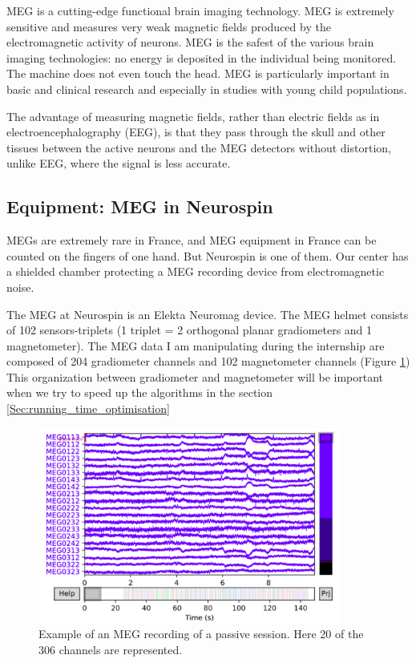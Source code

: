 MEG is a cutting-edge functional brain imaging technology. MEG is extremely sensitive and measures very weak magnetic fields produced by the electromagnetic activity of neurons. MEG is the safest of the various brain imaging technologies: no energy is deposited in the individual being monitored. The machine does not even touch the head. MEG is particularly important in basic and clinical research and especially in studies with young child populations.

The advantage of measuring magnetic fields, rather than electric fields as in electroencephalography (EEG), is that they pass through the skull and other tissues between the active neurons and the MEG detectors without distortion, unlike EEG, where the signal is less accurate.

\subsection{Equipment: MEG in Neurospin}

MEGs are extremely rare in France, and MEG equipment in France can be counted on the fingers of one hand. But Neurospin is one of them. Our center has a shielded chamber protecting a MEG recording device from electromagnetic noise.

The MEG at Neurospin is an Elekta Neuromag device. The MEG helmet consists of 102 sensors-triplets (1 triplet = 2 orthogonal planar gradiometers and 1 magnetometer). The MEG data I am manipulating during the internship are composed of 204 gradiometer channels and 102 magnetometer channels (Figure \ref{raw_data}) This organization between gradiometer and magnetometer will be important when we try to speed up the algorithms in the section \ref{Sec:running_time_optimisation}

\begin{figure}[ht]
    \centering
    \includegraphics[width=10cm]{images_report/preprocessing/raw_data/Example_of_MEG_recording_reduced.png}
    \caption{Example of an MEG recording of a passive session. Here 20 of the 306 channels are represented.}
    \label{raw_data}
\end{figure}

